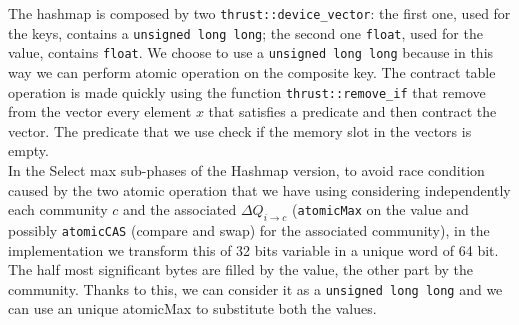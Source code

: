The hashmap is composed by two \verb|thrust::device_vector|: the first one, used for the keys, contains a \verb|unsigned long long|; the second one \verb|float|, used for the value, contains \verb|float|. We choose to use a  \verb|unsigned long long| because in this way we can perform atomic operation on the composite key. The contract table operation is made quickly using the function \verb|thrust::remove_if| that remove from the vector every element $x$ that satisfies a predicate and then contract the vector. The predicate that we use check if the memory slot in the vectors is empty. \\
In the Select max sub-phases of the Hashmap version, to avoid race condition caused by the two atomic operation that we have using considering independently each community $c$ and the associated $\Delta Q_{i\rightarrow c}$ (\verb|atomicMax| on the value and possibly \verb|atomicCAS| (compare and swap) for the associated community), in the implementation we transform this of 32 bits variable in a unique word of 64 bit. The half most significant bytes are filled by the value, the other part by the community. Thanks to this, we can consider it as a \verb|unsigned long long| and we can use an unique atomicMax to substitute both the values. 
